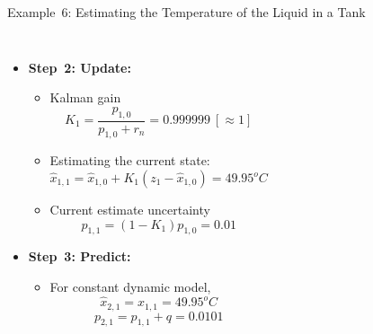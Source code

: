 \begin{frame}{Example~6: Estimating the Temperature of the Liquid in a Tank}
\begin{columns}
\begin{itemize}
\begin{itemize}
                \item The measurement uncertainty (since $\sigma=0.1$)
                $$r_1 = 0.01$$
            \end{itemize}
        \item \textbf{Step~2: Update:}
            \begin{itemize}
                \item Kalman gain
                $$K_1 = \frac{p_{1,0}}{p_{1,0} + r_n} = 0.999999~[\approx 1]$$
                \item Estimating the current state:
                $$\hat{x}_{1,1} = \hat{x}_{1,0} + K_1 (z_1 - \hat{x}_{1,0}) = 49.95^o C$$
                \item  Current estimate uncertainty
                $$p_{1,1} = (1-K_1) p_{1,0} = 0.01$$
            \end{itemize}
        \item \textbf{Step~3: Predict:}
            \begin{itemize}
                \item For constant dynamic model,  
                $$\hat{x}_{2,1} = \hat{x}_{1,1} = 49.95^o C$$
                $$p_{2,1} = p_{1,1} + q = 0.0101$$
                
            \end{itemize}
    \end{itemize}
\end{columns}
    
\end{frame}

